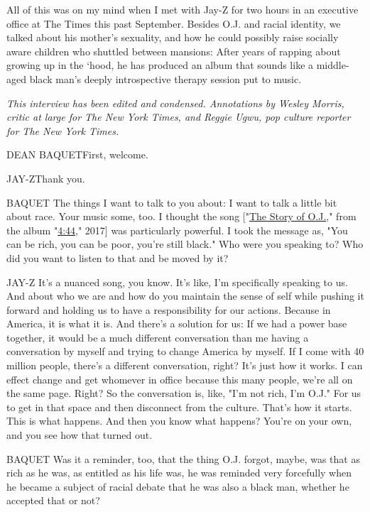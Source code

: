 All of this was on my mind when I met with Jay-Z for two hours in an
executive office at The Times this past September. Besides O.J. and
racial identity, we talked about his mother's sexuality, and how he
could possibly raise socially aware children who shuttled between
mansions: After years of rapping about growing up in the `hood, he has
produced an album that sounds like a middle-aged black man's deeply
introspective therapy session put to music.

\emph{This interview has been edited and condensed. Annotations by
Wesley Morris, critic at large for The New York Times, and Reggie Ugwu,
pop culture reporter for The New York Times.}

DEAN BAQUETFirst, welcome.

JAY-ZThank you.

BAQUET The things I want to talk to you about: I want to talk a little
bit about race. Your music some, too. I thought the song
{[}"\href{https://www.youtube.com/watch?v=RM7lw0Ovzq0}{The Story of
O.J.}," from the album
"\href{https://listen.tidal.com/album/75413011}{4:44}," 2017{]} was
particularly powerful. I took the message as, "You can be rich, you can
be poor, you're still black." Who were you speaking to? Who did you want
to listen to that and be moved by it?

JAY-Z It's a nuanced song, you know. It's like, I'm specifically
speaking to us. And about who we are and how do you maintain the sense
of self while pushing it forward and holding us to have a responsibility
for our actions. Because in America, it is what it is. And there's a
solution for us: If we had a power base together, it would be a much
different conversation than me having a conversation by myself and
trying to change America by myself. If I come with 40 million people,
there's a different conversation, right? It's just how it works. I can
effect change and get whomever in office because this many people, we're
all on the same page. Right? So the conversation is, like, "I'm not
rich, I'm O.J." For us to get in that space and then disconnect from the
culture. That's how it starts. This is what happens. And then you know
what happens? You're on your own, and you see how that turned out.

BAQUET Was it a reminder, too, that the thing O.J. forgot, maybe, was
that as rich as he was, as entitled as his life was, he was reminded
very forcefully when he became a subject of racial debate that he was
also a black man, whether he accepted that or not?

